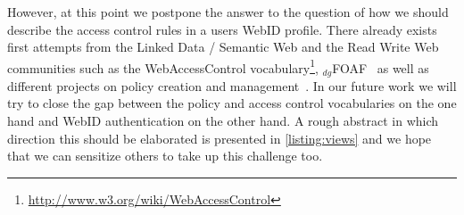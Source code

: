 \documentclass[a4paper]{llncs}
\begin{document}
However, at this point we postpone the answer to the question of how we should describe the access control rules in a users WebID profile.
There already exists first attempts from the Linked Data / Semantic Web and the Read Write Web communities such as the WebAccessControl vocabulary\footnote{\url{http://www.w3.org/wiki/WebAccessControl}}, $_{dg}$FOAF~\cite{schwagereit-f-2010-181-a} as well as different projects on policy creation and management~\cite{kagal-l-2005--a}.
In our future work we will try to close the gap between the policy and access control vocabularies on the one hand and WebID authentication on the other hand.
A rough abstract in which direction this should be elaborated is presented in \autoref{listing:views} and we hope that we can sensitize others to take up this challenge too.



\end{document}
